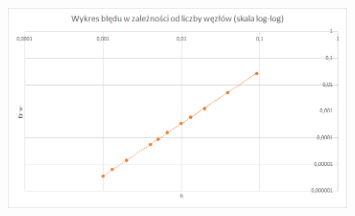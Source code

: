 \begin{samepage}
	
	\FloatBarrier
	\begin{figure}[!ht]
		\begin{center}
			\includegraphics[width=0.8\textwidth]{Lab4/charts/zad4/c/error.png}
		\end{center}
	\end{figure}
	\FloatBarrier
\end{samepage}






